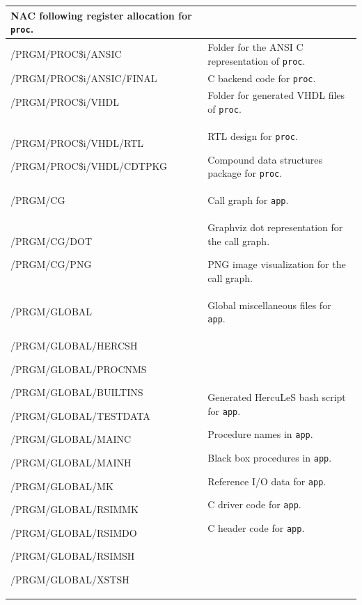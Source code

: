 \documentclass[a4paper]{article}
\newlength{\DUtablewidth} %
\begin{document}
{\begin{longtable*}[c]{|p{0.319\DUtablewidth}|p{0.610\DUtablewidth}|}
NAC following register allocation for \texttt{proc}.
 \\
\hline

/PRGM/PROC\$i/ANSIC
 & 
Folder for the ANSI C representation of \texttt{proc}.
 \\
\hline

/PRGM/PROC\$i/ANSIC/FINAL
 & 
C backend code for \texttt{proc}.
 \\
\hline

/PRGM/PROC\$i/VHDL
 & 
Folder for generated VHDL files of \texttt{proc}.
 \\
\hline

/PRGM/PROC\$i/VHDL/RTL

/PRGM/PROC\$i/VHDL/CDTPKG
 & 
RTL design for \texttt{proc}.

Compound data structures package for \texttt{proc}.
 \\
\hline

/PRGM/CG
 & 
Call graph for \texttt{app}.
 \\
\hline

/PRGM/CG/DOT

/PRGM/CG/PNG
 & 
Graphviz dot representation for the call graph.

PNG image visualization for the call graph.
 \\
\hline

/PRGM/GLOBAL
 & 
Global miscellaneous files for \texttt{app}.
 \\
\hline

/PRGM/GLOBAL/HERCSH

/PRGM/GLOBAL/PROCNMS

/PRGM/GLOBAL/BUILTINS

/PRGM/GLOBAL/TESTDATA

/PRGM/GLOBAL/MAINC

/PRGM/GLOBAL/MAINH

/PRGM/GLOBAL/MK

/PRGM/GLOBAL/RSIMMK

/PRGM/GLOBAL/RSIMDO

/PRGM/GLOBAL/RSIMSH

/PRGM/GLOBAL/XSTSH
 & 
Generated HercuLeS bash script for \texttt{app}.

Procedure names in \texttt{app}.

Black box procedures in \texttt{app}.

Reference I/O data for \texttt{app}.

C driver code for \texttt{app}.

C header code for \texttt{app}.


\end{longtable*}}
\end{document}
